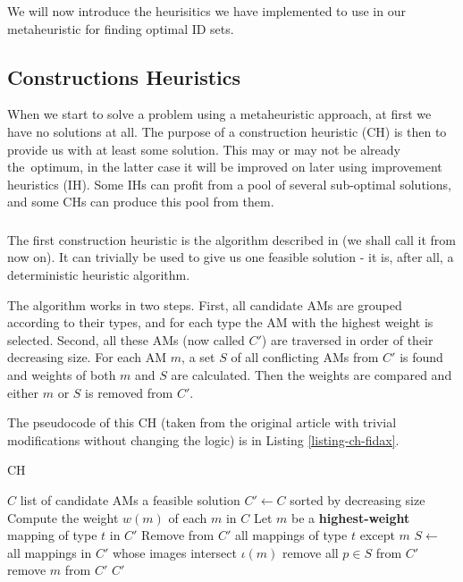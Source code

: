 We will now introduce the heurisitics we have implemented to use in our metaheuristic for finding optimal ID sets.

\subsection{Constructions Heuristics}
\label{section-mip-chs}

When we start to solve a problem using a metaheuristic approach, at first we have no solutions at all. The purpose of a construction heuristic (CH) is then to provide us with at least some solution. This may or may not be already the~optimum, in the latter case it will be improved on later using improvement heuristics (IH). Some IHs can profit from a pool of several sub-optimal solutions, and some CHs can produce this pool from them.

\subsubsection{}
\label{section-mip-fidax}

The first construction heuristic is the algorithm described in \cite{fidax} (we shall call it  from now on). It can trivially be used to give us one feasible solution - it is, after all, a deterministic heuristic algorithm.

The algorithm works in two steps. First, all candidate AMs are grouped according to their types, and for each type the AM with the highest weight is selected. Second, all these AMs (now called $C'$) are traversed in order of their decreasing size. For each AM $m$, a set $S$ of all conflicting AMs from $C'$ is found and weights of both $m$ and $S$ are calculated. Then the weights are compared and either $m$ or $S$ is removed from $C'$.

The pseudocode of this CH (taken from the original article with trivial modifications without changing the logic) is in Listing \ref{listing-ch-fidax}.

\begin{algorithm}
\caption{ CH}
\label{listing-ch-fidax}
\begin{algorithmic}
\REQUIRE $C$ list of candidate AMs
\ENSURE a feasible solution
\STATE $C' \gets C$ sorted by decreasing size
\STATE Compute the weight $w(m)$ of each $m$ in $C$
  \STATE Let $m$ be a \textbf{highest-weight} mapping of type $t$ in $C'$
  \STATE Remove from $C'$ all mappings of type $t$ except $m$
\ENDFOR
{}
  \STATE $S \gets$ all mappings in $C'$ whose images intersect $\iota(m)$
    \STATE remove all $p \in S$ from $C'$
  \ELSE
    \STATE remove $m$ from $C'$
  \ENDIF
\ENDFOR
\RETURN $C'$
\end{algorithmic}
\end{algorithm}

